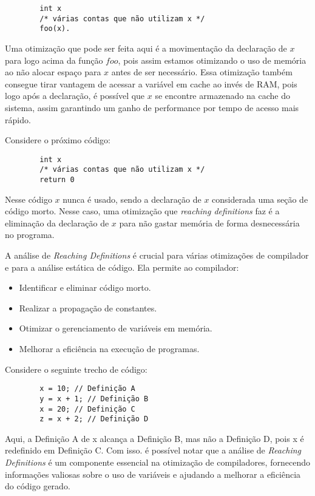 \documentclass{article}
\begin{document}
    \begin{verbatim}
        int x
        /* várias contas que não utilizam x */
        foo(x).
    \end{verbatim}

    Uma otimização que pode ser feita aqui é a movimentação da declaração de $x$ para logo acima da função $foo$, pois assim estamos
    otimizando o uso de memória ao não alocar espaço para $x$ antes de ser necessário. Essa otimização também consegue tirar vantagem
    de acessar a variável em cache ao invés de RAM, pois logo após a declaração, é possível que $x$ se encontre armazenado na
    cache do sistema, assim garantindo um ganho de performance por tempo de acesso mais rápido.

    Considere o próximo código:

    \begin{verbatim}
        int x
        /* várias contas que não utilizam x */
        return 0
    \end{verbatim}

    Nesse código $x$ nunca é usado, sendo a declaração de $x$ considerada uma seção de código morto.
    Nesse caso, uma otimização que \emph{reaching definitions} faz é a eliminação da declaração de $x$ para não gastar memória
    de forma desnecessária no programa.

    A análise de \textit{Reaching Definitions} é crucial para várias otimizações de compilador e para a
    análise estática de código. Ela permite ao compilador:

    \begin{itemize}
        \item Identificar e eliminar código morto.
        \item Realizar a propagação de constantes.
        \item Otimizar o gerenciamento de variáveis em memória.
        \item Melhorar a eficiência na execução de programas.
    \end{itemize}

    Considere o seguinte trecho de código:

    \begin{verbatim}
        x = 10; // Definição A
        y = x + 1; // Definição B
        x = 20; // Definição C
        z = x + 2; // Definição D
    \end{verbatim}

    Aqui, a {Definição A} de {x} alcança a {Definição B}, mas não a {Definição D},
    pois {x} é redefinido em {Definição C}. Com isso. é possível notar que a análise de
    \textit{Reaching Definitions} é um componente essencial na otimização de compiladores,
    fornecendo informações valiosas sobre o uso de variáveis e ajudando a melhorar a
    eficiência do código gerado.
\end{document}
